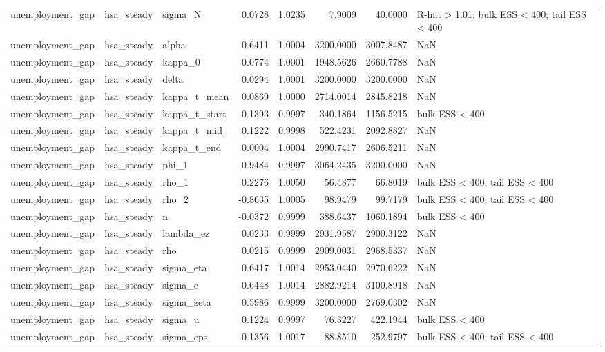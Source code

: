\begin{tabular}{lllrrrrl}
unemployment\_gap & hsa\_steady & sigma\_N & 0.0728 & 1.0235 & 7.9009 & 40.0000 & R-hat > 1.01; bulk ESS < 400; tail ESS < 400 \\
unemployment\_gap & hsa\_steady & alpha & 0.6411 & 1.0004 & 3200.0000 & 3007.8487 & NaN \\
unemployment\_gap & hsa\_steady & kappa\_0 & 0.0774 & 1.0001 & 1948.5626 & 2660.7788 & NaN \\
unemployment\_gap & hsa\_steady & delta & 0.0294 & 1.0001 & 3200.0000 & 3200.0000 & NaN \\
unemployment\_gap & hsa\_steady & kappa\_t\_mean & 0.0869 & 1.0000 & 2714.0014 & 2845.8218 & NaN \\
unemployment\_gap & hsa\_steady & kappa\_t\_start & 0.1393 & 0.9997 & 340.1864 & 1156.5215 & bulk ESS < 400 \\
unemployment\_gap & hsa\_steady & kappa\_t\_mid & 0.1222 & 0.9998 & 522.4231 & 2092.8827 & NaN \\
unemployment\_gap & hsa\_steady & kappa\_t\_end & 0.0004 & 1.0004 & 2990.7417 & 2606.5211 & NaN \\
unemployment\_gap & hsa\_steady & phi\_1 & 0.9484 & 0.9997 & 3064.2435 & 3200.0000 & NaN \\
unemployment\_gap & hsa\_steady & rho\_1 & 0.2276 & 1.0050 & 56.4877 & 66.8019 & bulk ESS < 400; tail ESS < 400 \\
unemployment\_gap & hsa\_steady & rho\_2 & -0.8635 & 1.0005 & 98.9479 & 99.7179 & bulk ESS < 400; tail ESS < 400 \\
unemployment\_gap & hsa\_steady & n & -0.0372 & 0.9999 & 388.6437 & 1060.1894 & bulk ESS < 400 \\
unemployment\_gap & hsa\_steady & lambda\_ez & 0.0233 & 0.9999 & 2931.9587 & 2900.3122 & NaN \\
unemployment\_gap & hsa\_steady & rho & 0.0215 & 0.9999 & 2909.0031 & 2968.5337 & NaN \\
unemployment\_gap & hsa\_steady & sigma\_eta & 0.6417 & 1.0014 & 2953.0440 & 2970.6222 & NaN \\
unemployment\_gap & hsa\_steady & sigma\_e & 0.6448 & 1.0014 & 2882.9214 & 3100.8918 & NaN \\
unemployment\_gap & hsa\_steady & sigma\_zeta & 0.5986 & 0.9999 & 3200.0000 & 2769.0302 & NaN \\
unemployment\_gap & hsa\_steady & sigma\_u & 0.1224 & 0.9997 & 76.3227 & 422.1944 & bulk ESS < 400 \\
unemployment\_gap & hsa\_steady & sigma\_eps & 0.1356 & 1.0017 & 88.8510 & 252.9797 & bulk ESS < 400; tail ESS < 400 \\

\end{tabular}
